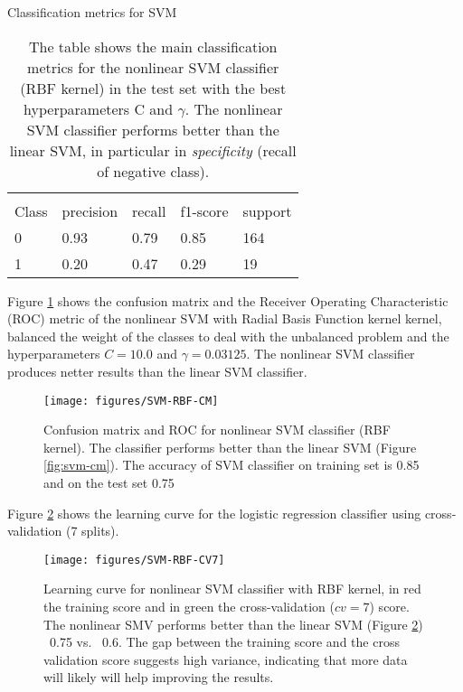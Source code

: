 \documentclass[11pt]{article}
\theoremstyle{definition}
\theoremstyle{remark}
\begin{document}
\begin{table}[H]
\caption{Classification metrics for SVM} 
\begin{center} 
\begin{tabular}{lllll}
\hline
\multicolumn{1}{c}{} \\
Class & precision & recall & f1-score & support     \\
\hline
0 & 0.93  &    0.79   &   0.85   &    164 \\
1 & 0.20  &    0.47   &   0.29   &    19 \\
\hline
\end{tabular}
\caption{The table shows the main classification metrics for the nonlinear SVM classifier (RBF kernel) in the test set with the best hyperparameters C and $\gamma$. The nonlinear SVM classifier performs better than the linear SVM, in particular in \emph{specificity} (recall of negative class).} \label{tab:svmnonlinear} 
\end{center}
\end{table}

Figure \ref{fig:svm-rbf-cm} shows the confusion matrix and the Receiver Operating Characteristic (ROC) metric of the nonlinear SVM with Radial Basis Function kernel kernel, balanced the weight of the classes to deal with the unbalanced problem and the hyperparameters $C= 10.0$ and $\gamma= 0.03125$. The nonlinear SVM classifier produces netter results than the linear SVM classifier.

\begin{figure}[H]
        \centering
        \texttt{[image: figures/SVM-RBF-CM]}
        \caption{Confusion matrix and ROC for nonlinear SVM classifier (RBF kernel). The classifier performs better than the linear SVM (Figure \ref{fig:svm-cm}). The accuracy of SVM classifier on training set is 0.85 and on the test set 0.75} \label{fig:svm-rbf-cm}
\end{figure}

Figure \ref{fig:svm-cv7} shows the learning curve for the logistic regression classifier using cross-validation (7 splits).
\begin{figure}[H]
        \centering
        \texttt{[image: figures/SVM-RBF-CV7]}
        \caption{Learning curve for nonlinear SVM classifier with RBF kernel, in red the training score and in green the cross-validation ($cv=7$) score. The nonlinear SMV performs better than the linear SVM (Figure \ref{fig:svm-cv7}) ~0.75 vs. ~0.6. The gap between the training score and the cross validation score suggests high variance, indicating that more data will likely will help improving the results. 
        } \label{fig:svm-cv7}
\end{figure}
\end{document}
